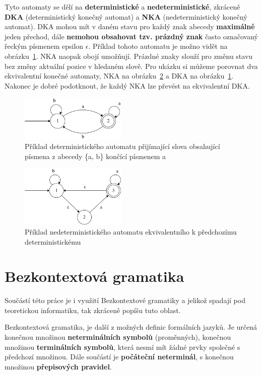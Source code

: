 Tyto automaty se dělí na \textbf{deterministické} a \textbf{nedeterministické}, zkráceně \textbf{DKA} (deterministický konečný automat) a \textbf{NKA} (nedeterministický konečný automat).
DKA mohou mít v daném stavu pro každý znak abecedy \textbf{maximálně} jeden přechod, dále \textbf{nemohou obsahovat tzv. prázdný znak} často označovaný řeckým písmenem epsilon $\epsilon$.
Příklad tohoto automatu je možno vidět na obrázku~\ref{fig:DFAex}.
NKA naopak obojí umožňují. 
Prázdné znaky slouží pro změnu stavu bez změny aktuální pozice v hledaném slově. 
Pro ukázku si můžeme porovnat dva ekvivalentní konečné automaty,
NKA na obrázku~\ref{fig:NFAex} a DKA na obrázku~\ref{fig:DFAex}.
Nakonec je dobré podotknout, že každý NKA lze převést na ekvivalentní DKA.

\begin{figure}[!h]
	\centering
	\includegraphics[width=0.45\textwidth]{Figures/DFA_example.pdf}
	\caption{Příklad deterministického automatu přijímající slova obsahující písmena z abecedy \{a, b\} končící písmenem a}
	\label{fig:DFAex}
\end{figure}

\begin{figure}[!h]
	\centering
	\includegraphics[width=0.45\textwidth]{Figures/NFA_example.pdf}
	\caption{Příklad nedeterministického automatu ekvivalentního k předchozímu deterministickému}
	\label{fig:NFAex}
\end{figure}

\section{Bezkontextová gramatika}
Součástí této práce je i využití Bezkontextové gramatiky a jelikož spadají pod teoretickou informatiku, 
tak zkráceně popíšu tuto oblast.

Bezkontextová gramatika, je další z možných definic formálních jazyků. 
Je určená konečnou množinou \textbf{neterminálních symbolů} (proměnných), konečnou množinou \textbf{terminálních symbolů}, která nesmí mít žádné prvky společné s předchozí množinou.
Dále součástí je \textbf{počáteční neterminál}, s konečnou množinou \textbf{přepisových pravidel}\cite{MUNIFL}.

